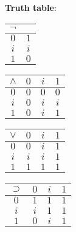 \documentclass[a4paper]{article}
\begin{document}
\textbf{Truth table}:
\begin{center}
	\renewcommand{\arraystretch}{1.2}
	\begin{tabular}{|c|c|}
		\hline
		$\lnot$ & \\\hline
		$0$ & $1$ \\
		$i$ & $i$ \\
		$1$ & $0$ \\\hline
	\end{tabular}
	\quad
	\begin{tabular}{|c|ccc|}
		\hline
		$\land$ & $0$ & $i$ & $1$ \\\hline
		$0$ & $0$ & $0$ & $0$ \\
		$i$ & $0$ & $i$ & $i$ \\
		$1$ & $0$ & $i$ & $1$ \\\hline
	\end{tabular}
	\quad
	\begin{tabular}{|c|ccc|}
		\hline
		$\lor$ & $0$ & $i$ & $1$ \\\hline
		$0$ & $0$ & $i$ & $1$ \\
		$i$ & $i$ & $i$ & $1$ \\
		$1$ & $1$ & $1$ & $1$ \\\hline
	\end{tabular}
	\quad
	\begin{tabular}{|c|ccc|}
		\hline
		$\supset$ & $0$ & $i$ & $1$ \\\hline
		$0$ & $1$ & $1$ & $1$ \\
		$i$ & $i$ & $1$ & $1$ \\
		$1$ & $0$ & $i$ & $1$ \\\hline
	\end{tabular}
\end{center}

\pagebreak
\end{document}
